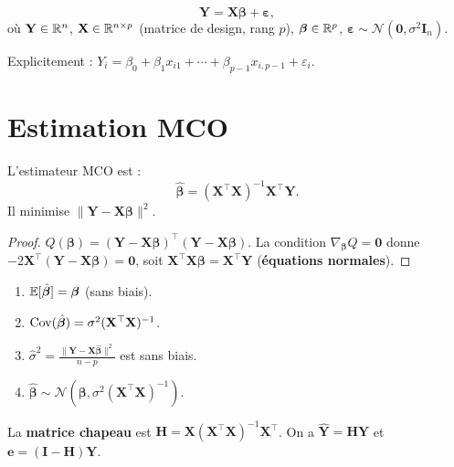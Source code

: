 \begin{definition}
\[
\mathbf{Y} = \mathbf{X}\bm{\beta} + \bm{\varepsilon},
\]
o\`u $\mathbf{Y}\in\mathbb{R}^n$, $\mathbf{X}\in\mathbb{R}^{n\times p}$ (matrice de design, rang $p$), $\bm{\beta}\in\mathbb{R}^p$, $\bm{\varepsilon}\sim\mathcal{N}(\mathbf{0},\sigma^2\mathbf{I}_n)$.

Explicitement : $Y_i=\beta_0+\beta_1 x_{i1}+\cdots+\beta_{p-1}x_{i,p-1}+\varepsilon_i$.
\end{definition}

\section{Estimation MCO}

\begin{theoreme}
L'estimateur MCO est :
\[
\hat{\bm{\beta}} = (\mathbf{X}^\top\mathbf{X})^{-1}\mathbf{X}^\top\mathbf{Y}.
\]
Il minimise $\|\mathbf{Y}-\mathbf{X}\bm{\beta}\|^2$.
\end{theoreme}

\begin{proof}
$Q(\bm{\beta})=(\mathbf{Y}-\mathbf{X}\bm{\beta})^\top(\mathbf{Y}-\mathbf{X}\bm{\beta})$. La condition $\nabla_{\bm{\beta}}Q=\mathbf{0}$ donne $-2\mathbf{X}^\top(\mathbf{Y}-\mathbf{X}\bm{\beta})=\mathbf{0}$, soit $\mathbf{X}^\top\mathbf{X}\bm{\beta}=\mathbf{X}^\top\mathbf{Y}$ (\textbf{\'equations normales}).
\end{proof}

\begin{theoreme}[Propri\'et\'es]
\begin{enumerate}
\item $\mathbb{E}[\hat{\bm{\beta}}]=\bm{\beta}$ (sans biais).
\item $\operatorname{Cov}(\hat{\bm{\beta}})=\sigma^2(\mathbf{X}^\top\mathbf{X})^{-1}$.
\item $\hat{\sigma}^2=\frac{\|\mathbf{Y}-\mathbf{X}\hat{\bm{\beta}}\|^2}{n-p}$ est sans biais.
\item $\hat{\bm{\beta}}\sim\mathcal{N}(\bm{\beta},\sigma^2(\mathbf{X}^\top\mathbf{X})^{-1})$.
\end{enumerate}
\end{theoreme}

\begin{definition}
La \textbf{matrice chapeau} est $\mathbf{H}=\mathbf{X}(\mathbf{X}^\top\mathbf{X})^{-1}\mathbf{X}^\top$. On a $\hat{\mathbf{Y}}=\mathbf{H}\mathbf{Y}$ et $\mathbf{e}=(\mathbf{I}-\mathbf{H})\mathbf{Y}$.
\end{definition}

